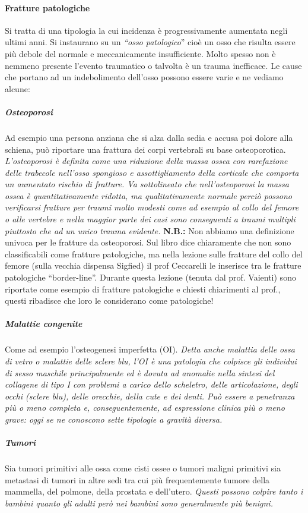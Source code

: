 \paragraph{Fratture patologiche}
Si tratta di una tipologia la cui incidenza è progressivamente aumentata negli ultimi anni. Si instaurano su un \emph{``osso patologico}'' cioè un osso che risulta essere più debole del normale e meccanicamente insufficiente. Molto spesso non è nemmeno presente l'evento traumatico o talvolta è un trauma inefficace. Le cause che portano ad un indebolimento dell'osso possono essere varie e ne vediamo alcune:

\subparagraph{Osteoporosi}
Ad esempio una persona anziana che si alza dalla sedia e accusa poi dolore alla schiena, può riportare una frattura dei corpi vertebrali su base osteoporotica. \emph{L'osteoporosi è definita come una riduzione della massa ossea con rarefazione delle trabecole nell'osso spongioso e assottigliamento della corticale che comporta un aumentato rischio di fratture. Va sottolineato che nell'osteoporosi la massa ossea è quantitativamente ridotta, ma qualitativamente normale perciò possono verificarsi fratture per traumi molto modesti come ad esempio al collo del femore o alle vertebre e nella maggior parte dei casi sono conseguenti a traumi multipli piuttosto che ad un unico trauma evidente.}
\textbf{N.B.:} Non abbiamo una definizione univoca per le fratture da osteoporosi. Sul libro dice chiaramente che non sono classificabili come fratture patologiche, ma nella lezione sulle fratture del collo del femore (sulla vecchia dispensa Sigfied) il prof Ceccarelli le inserisce tra le fratture patologiche ``border-line''. Durante questa lezione (tenuta dal prof. Vaienti) sono riportate come esempio di fratture patologiche e chiesti chiarimenti al prof., questi ribadisce che loro le considerano come patologiche!

\subparagraph{Malattie congenite}
Come ad esempio l'osteogenesi imperfetta (OI). \emph{Detta anche malattia delle ossa di vetro o malattie delle sclere blu, l'OI è una patologia che colpisce gli individui di sesso maschile principalmente ed è dovuta ad anomalie nella sintesi del collagene di tipo I con problemi a carico dello scheletro, delle articolazione, degli occhi (sclere blu), delle orecchie, della cute e dei denti. Può essere a penetranza più o meno completa e, conseguentemente, ad espressione clinica più o meno grave: oggi se ne conoscono sette tipologie a gravità diversa.}

\subparagraph{Tumori}
Sia tumori primitivi alle ossa come cisti ossee o tumori maligni primitivi sia metastasi di tumori in altre sedi tra cui più frequentemente tumore della mammella, del polmone, della prostata e dell'utero. \emph{Questi possono colpire tanto i bambini quanto gli adulti però nei bambini sono generalmente più benigni.}

